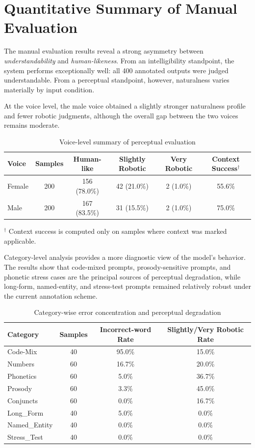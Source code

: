 \section{Quantitative Summary of Manual Evaluation}

The manual evaluation results reveal a strong asymmetry between \textit{understandability} and \textit{human-likeness}. From an intelligibility standpoint, the system performs exceptionally well: all 400 annotated outputs were judged understandable. From a perceptual standpoint, however, naturalness varies materially by input condition.

At the voice level, the male voice obtained a slightly stronger naturalness profile and fewer robotic judgments, although the overall gap between the two voices remains moderate.

\begin{table}[htbp]
\centering
\begin{tabular}{l c c c c c}
\toprule
Voice & Samples & Human-like & Slightly Robotic & Very Robotic & Context Success$^\dagger$ \\
\midrule
Female & 200 & 156 (78.0\%) & 42 (21.0\%) & 2 (1.0\%) & 55.6\% \\
Male & 200 & 167 (83.5\%) & 31 (15.5\%) & 2 (1.0\%) & 75.0\% \\
\bottomrule
\end{tabular}
\caption{Voice-level summary of perceptual evaluation}
\label{tab:core_system_voice_summary}
\end{table}

\noindent $^\dagger$ Context success is computed only on samples where context was marked applicable.

Category-level analysis provides a more diagnostic view of the model's behavior. The results show that code-mixed prompts, prosody-sensitive prompts, and phonetic stress cases are the principal sources of perceptual degradation, while long-form, named-entity, and stress-test prompts remained relatively robust under the current annotation scheme.

\begin{table}[htbp]
\centering
\begin{tabular}{l c c c}
\toprule
Category & Samples & Incorrect-word Rate & Slightly/Very Robotic Rate \\
\midrule
Code-Mix & 40 & 95.0\% & 15.0\% \\
Numbers & 60 & 16.7\% & 20.0\% \\
Phonetics & 60 & 5.0\% & 36.7\% \\
Prosody & 60 & 3.3\% & 45.0\% \\
Conjuncts & 60 & 0.0\% & 16.7\% \\
Long\_Form & 40 & 5.0\% & 0.0\% \\
Named\_Entity & 40 & 0.0\% & 0.0\% \\
Stress\_Test & 40 & 0.0\% & 0.0\% \\
\bottomrule
\end{tabular}
\caption{Category-wise error concentration and perceptual degradation}
\label{tab:core_system_category_summary}
\end{table}

